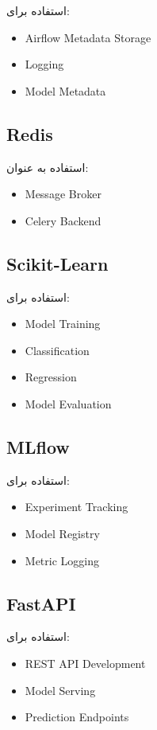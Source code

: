\documentclass[12pt,a4paper]{article}
\begin{document}
استفاده برای:

\begin{itemize}
\item Airflow Metadata Storage
\item Logging
\item Model Metadata
\end{itemize}

\subsection{Redis}

استفاده به عنوان:

\begin{itemize}
\item Message Broker
\item Celery Backend
\end{itemize}

\subsection{Scikit-Learn}

استفاده برای:

\begin{itemize}
\item Model Training
\item Classification
\item Regression
\item Model Evaluation
\end{itemize}

\subsection{MLflow}

استفاده برای:

\begin{itemize}
\item Experiment Tracking
\item Model Registry
\item Metric Logging
\end{itemize}

\subsection{FastAPI}

استفاده برای:

\begin{itemize}
\item REST API Development
\item Model Serving
\item Prediction Endpoints
\end{itemize}
\end{document}
